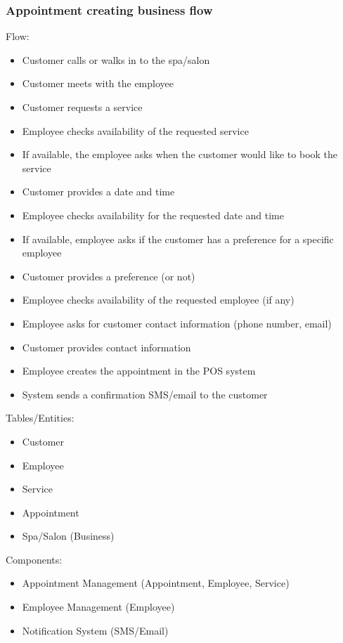 \documentclass[]{VUMIFTemplateClass}
\begin{document}
\vspace{1cm}


\subsubsection{Appointment creating business flow}

Flow:
\begin{itemize}
    \setlength{\itemsep}{2pt}
    \setlength{\parskip}{0pt}
    \setlength{\parsep}{0pt}
    \item Customer calls or walks in to the spa/salon
    \item Customer meets with the employee
    \item Customer requests a service
    \item Employee checks availability of the requested service
    \item If available, the employee asks when the customer would like to book the service
    \item Customer provides a date and time
    \item Employee checks availability for the requested date and time
    \item If available, employee asks if the customer has a preference for a specific employee
    \item Customer provides a preference (or not)
    \item Employee checks availability of the requested employee (if any)
    \item Employee asks for customer contact information (phone number, email)
    \item Customer provides contact information
    \item Employee creates the appointment in the POS system
    \item System sends a confirmation SMS/email to the customer
\end{itemize}

Tables/Entities:
\begin{itemize}
    \setlength{\itemsep}{2pt}
    \setlength{\parskip}{0pt}
    \setlength{\parsep}{0pt}
    \item Customer
    \item Employee
    \item Service
    \item Appointment
    \item Spa/Salon (Business)
\end{itemize}

Components:
\begin{itemize}
    \setlength{\itemsep}{2pt}
    \setlength{\parskip}{0pt}
    \setlength{\parsep}{0pt}
    \item Appointment Management (Appointment, Employee, Service)
    \item Employee Management (Employee)
    \item Notification System (SMS/Email)
\end{itemize}
\end{document}
